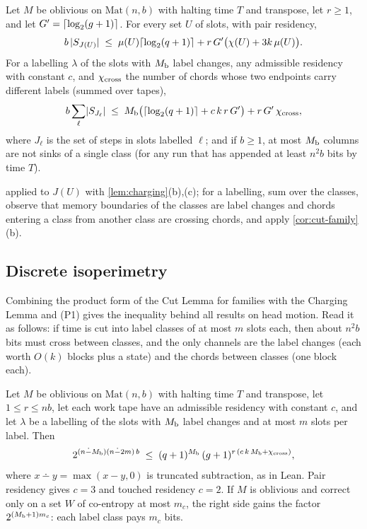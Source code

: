 \begin{corollary}\label{cor:slot-cut}
Let $M$ be oblivious on $\mathrm{Mat}(n,b)$ with halting time $T$ and transpose, let $r\ge1$, and
let $G'=\lceil \log_2 (g+1) \rceil$. For every set $U$ of slots, with pair residency,
\[
  b\,\lvert S_{J(U)} \rvert\;\le\;\mu(U)\lceil \log_2 (q+1) \rceil+r\,G'\bigl(\chi(U)+3k\,\mu(U)\bigr).
\]
For a labelling $\lambda$ of the slots with $M_{\mathrm{b}}$ label changes, any admissible residency with
constant $c$, and $\chi_{\mathrm{cross}}$ the number of chords whose two endpoints carry different labels
(summed over tapes),
\[
  b\sum_{\ell}\lvert S_{J_\ell} \rvert\;\le\;M_{\mathrm{b}}\bigl(\lceil \log_2 (q+1) \rceil+c\,k\,r\,G'\bigr)+r\,G'\,\chi_{\mathrm{cross}},
\]
where $J_\ell$ is the set of steps in slots labelled $\ell$; and if $b\ge1$, at most $M_{\mathrm{b}}$
columns are not sinks of a single class (for any run that has appended at least $n^2b$ bits by time $T$).
\end{corollary}

\begin{outline}
 applied to $J(U)$ with \cref{lem:charging}(b),(c); for a labelling, sum over the
classes, observe that memory boundaries of the classes are label changes and chords entering a
class from another class are crossing chords, and apply \cref{cor:cut-family}(b).
\end{outline}

\subsection{Discrete isoperimetry}

Combining the product form of the Cut Lemma for families with the Charging Lemma and (P1) gives the
inequality behind all results on head motion.
Read it as follows: if time is cut into label classes of at most $m$ slots each, then about
$n^2b$ bits must cross between classes, and the only channels are the label changes (each worth
$O(k)$ blocks plus a state) and the chords between classes (one block each).

\begin{corollary}\label{cor:isoperimetry}
Let $M$ be oblivious on $\mathrm{Mat}(n,b)$ with halting time $T$ and transpose, let
$1\le r\le nb$, let each work tape have an admissible residency with constant $c$, and let
$\lambda$ be a labelling of the slots with $M_{\mathrm{b}}$ label changes and at most $m$ slots per label.
Then
\[
  2^{(n\mathbin{\dot{-}}M_{\mathrm{b}})(n\mathbin{\dot{-}} 2m)\,b}\;\le\;(q+1)^{M_{\mathrm{b}}}\,(g+1)^{r\,(c\,k\,M_{\mathrm{b}}+\chi_{\mathrm{cross}})},
\]
where $x\dotminus y=\max(x-y,0)$ is truncated subtraction, as in Lean.
Pair residency gives $c=3$ and touched residency $c=2$. If $M$ is oblivious and correct only on
a set $W$ of co-entropy at most $m_c$, the right side gains the factor $2^{(M_{\mathrm{b}}+1)m_c}$: each
label class pays $m_c$ bits.
\end{corollary}

